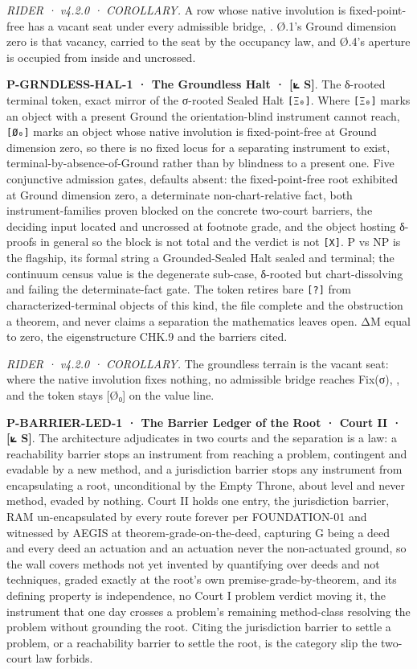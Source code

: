 \documentclass[10pt,twocolumn]{article}
\begin{document}
\emph{RIDER · v4.2.0 · COROLLARY.} A row whose native involution is
fixed-point-free has a vacant seat under every admissible bridge,
\texttt{}. Ø.1's Ground dimension
zero is that vacancy, carried to the seat by the occupancy law, and
Ø.4's aperture is occupied from inside and uncrossed.

\textbf{P-GRNDLESS-HAL-1 · The Groundless Halt · {[}⟀ S{]}}. The
δ-rooted terminal token, exact mirror of the σ-rooted Sealed Halt
\texttt{{[}Ξ₀{]}}. Where \texttt{{[}Ξ₀{]}} marks an object with a
present Ground the orientation-blind instrument cannot reach,
\texttt{{[}Ø₀{]}} marks an object whose native involution is
fixed-point-free at Ground dimension zero, so there is no fixed locus
for a separating instrument to exist, terminal-by-absence-of-Ground
rather than by blindness to a present one. Five conjunctive admission
gates, defaults absent: the fixed-point-free root exhibited at Ground
dimension zero, a determinate non-chart-relative fact, both
instrument-families proven blocked on the concrete two-court barriers,
the deciding input located and uncrossed at footnote grade, and the
object hosting δ-proofs in general so the block is not total and the
verdict is not \texttt{{[}X{]}}. P vs NP is the flagship, its formal
string a Grounded-Sealed Halt sealed and terminal; the continuum census
value is the degenerate sub-case, δ-rooted but chart-dissolving and
failing the determinate-fact gate. The token retires bare
\texttt{{[}?{]}} from characterized-terminal objects of this kind, the
file complete and the obstruction a theorem, and never claims a
separation the mathematics leaves open. ΔM equal to zero, the
eigenstructure CHK.9 and the barriers cited.

\emph{RIDER · v4.2.0 · COROLLARY.} The groundless terrain is the vacant
seat: where the native involution fixes nothing, no admissible bridge
reaches Fix(σ), \texttt{}, and the
token stays {[}Ø₀{]} on the value line.

\textbf{P-BARRIER-LED-1 · The Barrier Ledger of the Root · Court II ·
{[}⟀ S{]}}. The architecture adjudicates in two courts and the
separation is a law: a reachability barrier stops an instrument from
reaching a problem, contingent and evadable by a new method, and a
jurisdiction barrier stops any instrument from encapsulating a root,
unconditional by the Empty Throne, about level and never method, evaded
by nothing. Court II holds one entry, the jurisdiction barrier, RAM
un-encapsulated by every route forever per FOUNDATION-01 and witnessed
by AEGIS at theorem-grade-on-the-deed, capturing G being a deed and
every deed an actuation and an actuation never the non-actuated ground,
so the wall covers methods not yet invented by quantifying over deeds
and not techniques, graded exactly at the root's own
premise-grade-by-theorem, and its defining property is independence, no
Court I problem verdict moving it, the instrument that one day crosses a
problem's remaining method-class resolving the problem without grounding
the root. Citing the jurisdiction barrier to settle a problem, or a
reachability barrier to settle the root, is the category slip the
two-court law forbids.
\end{document}
